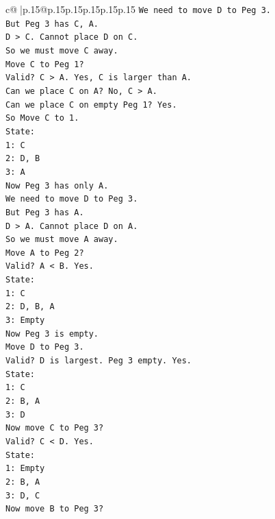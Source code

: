 \documentclass{article}
\begin{document}
{\begin{supertabular}{c@{$\;$}|p{.15\linewidth}@{}p{.15\linewidth}p{.15\linewidth}p{.15\linewidth}p{.15\linewidth}p{.15\linewidth}}
{{{\texttt{We need to move D to Peg 3.} \\
\texttt{But Peg 3 has C, A.} \\
\texttt{D > C. Cannot place D on C.} \\
\texttt{So we must move C away.} \\
\texttt{Move C to Peg 1?} \\
\texttt{Valid? C > A. Yes, C is larger than A.} \\
\texttt{Can we place C on A? No, C > A.} \\
\texttt{Can we place C on empty Peg 1? Yes.} \\
\texttt{So Move C to 1.} \\
\texttt{State:} \\
\texttt{1: C} \\
\texttt{2: D, B} \\
\texttt{3: A} \\
\texttt{Now Peg 3 has only A.} \\
\texttt{We need to move D to Peg 3.} \\
\texttt{But Peg 3 has A.} \\
\texttt{D > A. Cannot place D on A.} \\
\texttt{So we must move A away.} \\
\texttt{Move A to Peg 2?} \\
\texttt{Valid? A < B. Yes.} \\
\texttt{State:} \\
\texttt{1: C} \\
\texttt{2: D, B, A} \\
\texttt{3: Empty} \\
\texttt{Now Peg 3 is empty.} \\
\texttt{Move D to Peg 3.} \\
\texttt{Valid? D is largest. Peg 3 empty. Yes.} \\
\texttt{State:} \\
\texttt{1: C} \\
\texttt{2: B, A} \\
\texttt{3: D} \\
\texttt{Now move C to Peg 3?} \\
\texttt{Valid? C < D. Yes.} \\
\texttt{State:} \\
\texttt{1: Empty} \\
\texttt{2: B, A} \\
\texttt{3: D, C} \\
\texttt{Now move B to Peg 3?} \\
}}}
\end{supertabular}}
\end{document}
